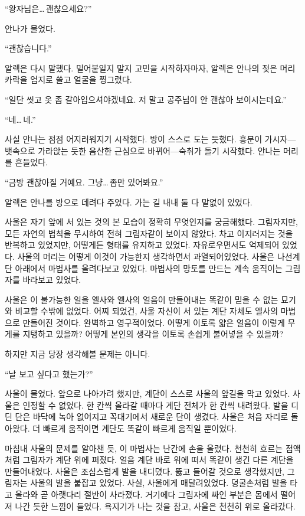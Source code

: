 ``왕자님은\ldots\,괜찮으세요?''

안나가 물었다.

``괜찮습니다.''

알렉은 다시 말했다. 밀어붙일지 말지 고민을 시작하자마자, 알렉은 안나의 젖은 머리카락을 엄지로 쓸고 얼굴을 찡그렸다.

``일단 씻고 옷 좀 갈아입으셔야겠네요. 저 말고 공주님이 안 괜찮아 보이시는데요.''

``네\ldots\,네.''

사실 안나는 점점 어지러워지기 시작했다. 방이 스스로 도는 듯했다. 흥분이 가시자—뱃속으로 가라앉는 듯한 음산한 근심으로 바뀌어—숙취가 돌기 시작했다. 안나는 머리를 흔들었다.

``금방 괜찮아질 거예요. 그냥\ldots\,좀만 있어봐요.''

알렉은 안나를 방으로 데려다 주었다. 가는 길 내내 둘 다 말없이 있었다.

\textbreak

사울은 자기 앞에 서 있는 것의 본 모습이 정확히 무엇인지를 궁금해했다. 그림자지만, 모든 자연의 법칙을 무시하여 전혀 그림자같이 보이지 않았다. 차고 이지러지는 것을 반복하고 있었지만, 어떻게든 형태를 유지하고 있었다. 자유로우면서도 억제되어 있었다. 사울의 머리는 어떻게 이것이 가능한지 생각하면서 과열되어있었다. 사울은 나선계단 아래에서 마법사를 올려다보고 있었다. 마법사의 망토를 만드는 계속 움직이는 그림자를 바라보고 있었다.

사울은 이 불가능한 일을 엘사와 엘사의 얼음이 만들어내는 똑같이 믿을 수 없는 묘기와 비교할 수밖에 없었다. 어찌 되었건, 사울 자신이 서 있는 계단 자체도 엘사의 마법으로 만들어진 것이다. 완벽하고 영구적이었다. 어떻게 이토록 얇은 얼음이 이렇게 무게를 지탱하고 있을까? 어떻게 본인의 생각을 이토록 손쉽게 불어넣을 수 있을까?

하지만 지금 당장 생각해볼 문제는 아니다.

``날 보고 싶다고 했는가?''

사울이 물었다. 앞으로 나아가려 했지만, 계단이 스스로 사울의 앞길을 막고 있었다. 사울은 인정할 수 없었다. 한 칸씩 올라갈 때마다 계단 전체가 한 칸씩 내려왔다. 발을 디딘 단은 바닥에 녹아 없어지고 꼭대기에서 새로운 단이 생겼다. 사울은 처음 자리로 돌아왔다. 더 빠르게 움직이면 계단도 똑같이 빠르게 움직일 뿐이었다.

마침내 사울의 문제를 알아챈 듯, 이 마법사는 난간에 손을 올렸다. 천천히 흐르는 점액처럼 그림자가 계단 위에 퍼졌다. 얼음 계단 바로 위에 떠서 똑같이 생긴 다른 계단을 만들어내었다. 사울은 조심스럽게 발을 내디뎠다. 뚫고 들어갈 것으로 생각했지만, 그림자는 사울의 발을 붙잡고 있었다. 사실, 사울에게 매달려있었다. 덩굴손처럼 발을 타고 올라와 곧 아랫다리 절반이 사라졌다. 거기에다 그림자에 싸인 부분은 몸에서 떨어져 나간 듯한 느낌이 들었다. 욕지기가 나는 것을 참고, 사울은 천천히 위로 올라갔다.

